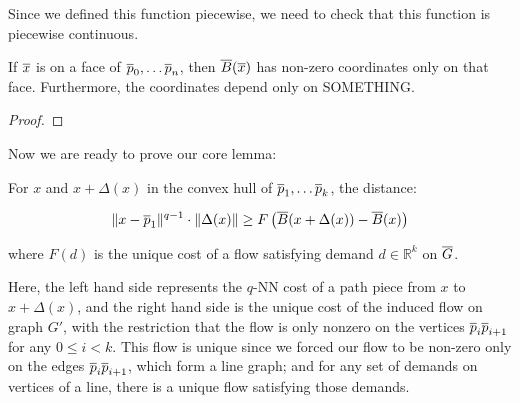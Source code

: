 Since we defined this function piecewise, we need to check that this
function is piecewise continuous.

\begin{lemma} If $\overline{x}$ is on a face of $\overline{p}_0, \ldots \overline{p}_n$, then
$\overline{B}(\overline{x})$ has non-zero coordinates only on that face. Furthermore, the
coordinates depend only on SOMETHING.

\end{lemma}

\begin{proof}

\end{proof}

Now we are ready to prove our core lemma:

\begin{lemma} For $x$ and $x+\Delta(x)$ in the convex hull of $\overline{p}_1,
\ldots \overline{p}_k$, the distance:

\[ \|x-\overline{p}_1\|^{q-1} \cdot \|\Delta(x)\| \geq
F\left(\overline{B}(x+\Delta(x))-\overline{B}(x)\right)\]

where $F(d)$ is the unique cost of a flow satisfying demand $d \in
\mathbb{R}^k$ on $\overline{G}$.

\end{lemma}

Here, the left hand side represents the $q$-NN cost of a path piece from
$x$ to $x+\Delta(x)$, and the right hand side is the unique cost of the
induced flow on graph $G'$, with the restriction that the flow is only
nonzero on the vertices $\overline{p}_i\overline{p}_{i+1}$ for any $0 \leq i < k$. This flow
is unique since we forced our flow to be non-zero only on the edges
$\overline{p}_i\overline{p}_{i+1}$, which form a line graph; and for any set of demands on
vertices of a line, there is a unique flow satisfying those demands.

